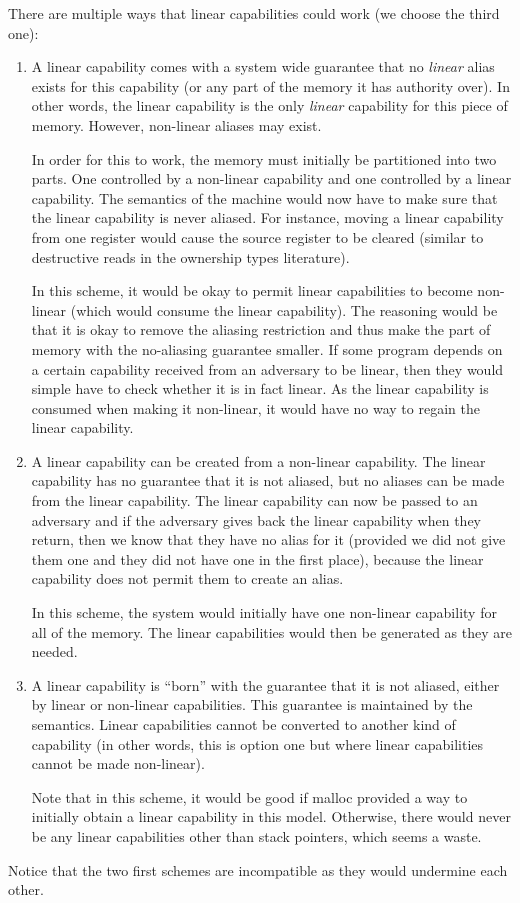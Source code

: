 \documentclass[a4paper]{article}
\begin{document}
There are multiple ways that linear capabilities could work (we choose the third one):
\begin{enumerate}
\item A linear capability comes with a system wide guarantee that no \emph{linear} alias exists for this capability (or any part of the memory it has authority over). In other words, the linear capability is the only \emph{linear} capability for this piece of memory.  However, non-linear aliases may exist.

In order for this to work, the memory must initially be partitioned into two parts. One controlled by a non-linear capability and one controlled by a linear capability. The semantics of the machine would now have to make sure that the linear capability is never aliased. For instance, moving a linear capability from one register would cause the source register to be cleared (similar to destructive reads in the ownership types literature). 

In this scheme, it would be okay to permit linear capabilities to become non-linear (which would consume the linear capability). The reasoning would be that it is okay to remove the aliasing restriction and thus make the part of memory with the no-aliasing guarantee smaller. If some program depends on a certain capability received from an adversary to be linear, then they would simple have to check whether it is in fact linear. As the linear capability is consumed when making it non-linear, it would have no way to regain the linear capability.

\item A linear capability can be created from a non-linear capability. The linear capability has no guarantee that it is not aliased, but no aliases can be made from the linear capability. The linear capability can now be passed to an adversary and if the adversary gives back the linear capability when they return, then we know that they have no alias for it (provided we did not give them one and they did not have one in the first place), because the linear capability does not permit them to create an alias.

In this scheme, the system would initially have one non-linear capability for all of the memory. The linear capabilities would then be generated as they are needed.
\item A linear capability is ``born'' with the guarantee that it is not aliased, either by linear or non-linear capabilities. This guarantee is maintained by the semantics. Linear capabilities cannot be converted to another kind of capability (in other words, this is option one but where linear capabilities cannot be made non-linear).

Note that in this scheme, it would be good if malloc provided a way to initially obtain a linear capability in this model.
Otherwise, there would never be any linear capabilities other than stack pointers, which seems a waste.
\end{enumerate}
Notice that the two first schemes are incompatible as they would undermine each other.
\end{document}
